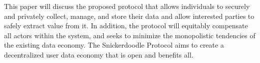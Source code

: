 This paper will discuss the proposed protocol that allows individuals to securely and privately collect, manage, and store their data and allow interested parties to safely extract value from it. In addition, the protocol will equitably compensate all actors within the system, and seeks to minimize the monopolistic tendencies of the existing data economy. The Snickerdoodle Protocol aims to create a decentralized user data economy that is open and benefits all.